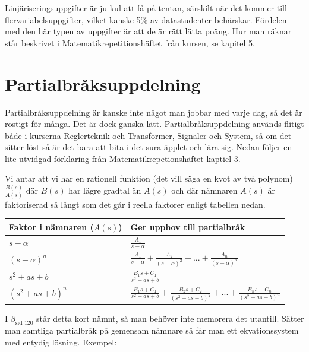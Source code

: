 \documentclass[a4paper]{article}
\newcommand{\mhb}[1]{$\beta_{\text{#1}}$}     %
\begin{document}
Linjäriseringsuppgifter är ju kul att få på tentan, särskilt när det kommer till flervariabelsuppgifter, vilket kanske 5\% av datastudenter behärskar. Fördelen med den här typen av uppgifter är att de är rätt lätta poäng. Hur man räknar står beskrivet i Matematikrepetitionshäftet från kursen, se kapitel 5.


\section{Partialbråksuppdelning}
\label{sec:partialbråksuppdelning}
Partialbråksuppdelning är kanske inte något man jobbar med varje dag, så det är rostigt för många. Det är dock ganska lätt. Partialbråksuppdelning används flitigt både i kurserna Reglerteknik och Transformer, Signaler och System, så om det sitter löst så är det bara att bita i det sura äpplet och lära sig. Nedan följer en lite utvidgad förklaring från Matematikrepetionshäftet kaptiel 3.

Vi antar att vi har en rationell funktion (det vill säga en kvot av två polynom) $\frac{B(s)}{A(s)}$ där $B(s)$ har lägre gradtal än $A(s)$ och där nämnaren $A(s)$ är faktoriserad så långt som det går i reella faktorer enligt tabellen nedan.

\begin{tabular}{l | l}
  Faktor i nämnaren ($A(s)$) & Ger upphov till partialbråk \\
  \hline
  $s - \alpha$       & $\frac{A_1}{s - \alpha}$ \\
  $(s - \alpha)^n$   & $\frac{A_1}{s - \alpha} + \frac{A_2}{(s - \alpha)^2} + ... + \frac{A_n}{(s - \alpha)^n}$ \\
  $s^2 + as + b$     & $\frac{B_1s + C_1}{s^2 + as + b}$ \\
  $(s^2 + as + b)^n$ & $\frac{B_1s + C_1}{s^2 + as + b} + \frac{B_2s + C_2}{(s^2 + as + b)^2} + ... + \frac{B_ns + C_n}{(s^2 + as + b)^n}$
\end{tabular}

I \mhb{sid 120} står detta kort nämnt, så man behöver inte memorera det utantill. Sätter man samtliga partialbråk på gemensam nämnare så får man ett ekvationssystem med entydig lösning. Exempel:
\end{document}

